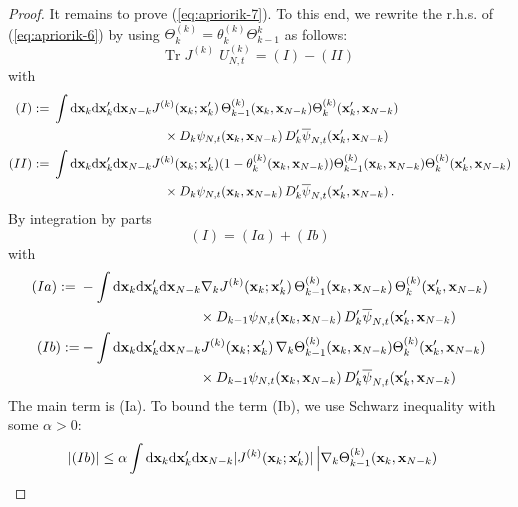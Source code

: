 \documentclass[11pt]{article}
\newcommand{\rd}{{\rm d}}
\newcommand{\be}{\begin{equation}}
\newcommand{\ee}{\end{equation}}
\newcommand{\bx}{{\bf x}}
\renewcommand{\a}{\alpha}
\newcommand{\tr}{\mbox{Tr}}
\begin{document}
\begin{proof}
It remains to prove (\ref{eq:apriorik-7}). To this end, we rewrite
the r.h.s. of (\ref{eq:apriorik-6}) by using $\Theta_k^{(k)} =
\theta_k^{(k)}\Theta_{k-1}^k$ as follows:
\begin{equation}\label{eq:apriorik-9}
\tr \; J^{(k)} \; U_{N,t}^{(k)} =  (I) - (II) \ee with
\be\label{eq:apriorik-9.5}
\begin{split}
(I): = \; &\int \rd \bx_k \rd \bx'_k \rd \bx_{N-k} J^{(k)} (\bx_k;
\bx'_k) \, \Theta_{k-1}^{(k)} (\bx_k,\bx_{N-k}) \Theta_k^{(k)}
(\bx'_k,\bx_{N-k}) \\ &\hspace{3cm} \times D_k  \psi_{N,t}
(\bx_k, \bx_{N-k}) \, D'_k \overline{ \psi}_{N,t} (\bx'_k,\bx_{N-k})\\
(II):= \; &\int \rd \bx_k \rd \bx'_k \rd \bx_{N-k} J^{(k)} (\bx_k;
\bx'_k) (1-\theta_k^{(k)} (\bx_k, \bx_{N-k})) \Theta_{k-1}^{(k)}
(\bx_k, \bx_{N-k}) \Theta_k^{(k)} (\bx'_k,\bx_{N-k}) \\
&\hspace{3cm} \times D_k  \psi_{N,t} (\bx_k, \bx_{N-k}) \, D'_k
\overline{ \psi}_{N,t} (\bx'_k,\bx_{N-k}) \,.
\end{split}
\end{equation}
By integration by parts
\begin{equation}\label{eq:apriorik-10}
(I) = (Ia) + (Ib)
\ee
with
\be
\begin{split}
(Ia):= \; & - \int \rd \bx_k \rd \bx'_k \rd \bx_{N-k}
 \nabla_k J^{(k)} (\bx_k; \bx'_k) \,
\Theta_{k-1}^{(k)} (\bx_k,\bx_{N-k}) \, \Theta_k^{(k)}
(\bx'_k,\bx_{N-k}) \\ &\hspace{3cm} \times  D_{k-1}  \psi_{N,t}
(\bx_k, \bx_{N-k}) \, D'_k \overline{\psi}_{N,t} (\bx'_k,\bx_{N-k})
\\
(Ib):= &- \int \rd \bx_k \rd \bx'_k \rd \bx_{N-k} J^{(k)} (\bx_k;
\bx'_k) \, \nabla_k \Theta_{k-1}^{(k)} (\bx_k, \bx_{N-k})
\Theta_k^{(k)} (\bx'_k,\bx_{N-k}) \\ &\hspace{3cm} \times  D_{k-1}
\psi_{N,t} (\bx_k, \bx_{N-k}) \, D'_k \overline{\psi}_{N,t}
(\bx'_k,\bx_{N-k})
\end{split}
\end{equation}
The main term is (Ia). To bound the term (Ib), we use Schwarz
inequality with some $\a>0$:
\begin{equation}\label{eq:apriorik-11}
\begin{split}
|(Ib)|\leq \;& \a \int \rd \bx_k \rd \bx'_k \rd \bx_{N-k} |J^{(k)} (\bx_k;
\bx'_k)| \, \Big|\nabla_k \Theta_{k-1}^{(k)} (\bx_k, \bx_{N-k})

\end{split}
\end{equation}
\end{proof}
\end{document}
